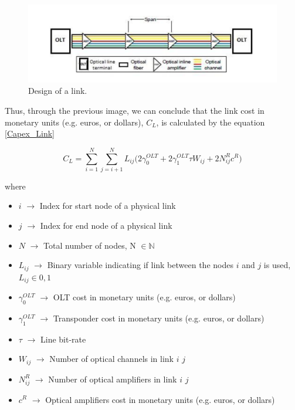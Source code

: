 \begin{figure}[h!]
\centering
\includegraphics[width=\textwidth]{sdf/ILP/figures/link_design}
\caption{Design of a link.}
\label{link_design}
\end{figure}

\newpage
Thus, through the previous image, we can conclude that the link cost in monetary units (e.g. euros, or dollars), $C_L$, is calculated by the equation \ref{Capex_Link}

\begin{equation}
C_L = \sum_{i=1}^N \sum_{j=i+1}^N L_{ij} \bigg( 2 \gamma_0^{OLT} + 2 \gamma_1^{OLT} \tau W_{ij} + 2 N^R_{ij} c^R \bigg)
\label{Capex_Link}
\end{equation}

\noindent
where
\begin{itemize}
\item{$i$               $\rightarrow$   Index for start node of a physical link}
\item{$j$               $\rightarrow$   Index for end node of a physical link}
\item{$N$				$\rightarrow$	Total number of nodes, N $\in \mathbb{N}$}
\item{$L_{ij}$			$\rightarrow$	Binary variable indicating if link between the nodes $i$ and $j$ is used, $L_{ij} \in {0, 1}$}
\item{$\gamma_0^{OLT}$	$\rightarrow$	OLT cost in monetary units (e.g. euros, or dollars)}
\item{$\gamma_1^{OLT}$	$\rightarrow$	Transponder cost in monetary units (e.g. euros, or dollars)}
\item{$\tau$		    $\rightarrow$	Line bit-rate}
\item{$W_{ij}$          $\rightarrow$   Number of optical channels in link $i$ $j$}
\item{$N^R_{ij}$    	$\rightarrow$	Number of optical amplifiers in link $i$ $j$}
\item{$c^R$				$\rightarrow$	Optical amplifiers cost in monetary units (e.g. euros, or dollars)}
\end{itemize}

